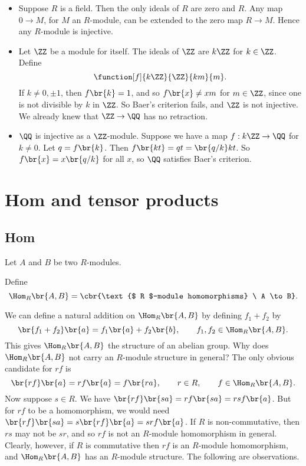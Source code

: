 \begin{example*}
\hfill
\begin{itemize}
\item Suppose $ R $ is a field. Then the only ideals of $ R $ are zero and $ R $. Any map $ 0 \to M $, for $ M $ an $ R $-module, can be extended to the zero map $ R \to M $. Hence any $ R $-module is injective.
\item Let $ \ZZ $ be a module for itself. The ideals of $ \ZZ $ are $ k\ZZ $ for $ k \in \ZZ $. Define
$$ \function[f]{k\ZZ}{\ZZ}{km}{m}. $$
If $ k \ne 0, \pm 1 $, then $ f\br{k} = 1 $, and so $ f\br{x} \ne xm $ for $ m \in \ZZ $, since one is not divisible by $ k $ in $ \ZZ $. So Baer's criterion fails, and $ \ZZ $ is not injective. We already knew that $ \ZZ \to \QQ $ has no retraction.
\item $ \QQ $ is injective as a $ \ZZ $-module. Suppose we have a map $ f : k\ZZ \to \QQ $ for $ k \ne 0 $. Let $ q = f\br{k} $. Then $ f\br{kt} = qt = \br{q / k}kt $. So $ f\br{x} = x\br{q / k} $ for all $ x $, so $ \QQ $ satisfies Baer's criterion.
\end{itemize}
\end{example*}

\pagebreak

\section{Hom and tensor products}

\subsection{Hom}


Let $ A $ and $ B $ be two $ R $-modules.

\begin{definition}
Define
$$ \Hom_R\br{A, B} = \cbr{\text{$ R $-module homomorphisms} \ A \to B}. $$
\end{definition}

We can define a natural addition on $ \Hom_R\br{A, B} $ by defining $ f_1 + f_2 $ by
$$ \br{f_1 + f_2}\br{a} = f_1\br{a} + f_2\br{b}, \qquad f_1, f_2 \in \Hom_R\br{A, B}. $$
This gives $ \Hom_R\br{A, B} $ the structure of an abelian group. Why does $ \Hom_R\br{A, B} $ not carry an $ R $-module structure in general? The only obvious candidate for $ rf $ is
$$ \br{rf}\br{a} = rf\br{a} = f\br{ra}, \qquad r \in R, \qquad f \in \Hom_R\br{A, B}. $$
Now suppose $ s \in R $. We have $ \br{rf}\br{sa} = rf\br{sa} = rsf\br{a} $. But for $ rf $ to be a homomorphism, we would need $ \br{rf}\br{sa} = s\br{rf}\br{a} = srf\br{a} $. If $ R $ is non-commutative, then $ rs $ may not be $ sr $, and so $ rf $ is not an $ R $-module homomorphism in general. Clearly, however, if $ R $ is commutative then $ rf $ is an $ R $-module homomorphism, and $ \Hom_R\br{A, B} $ has an $ R $-module structure. The following are observations.

